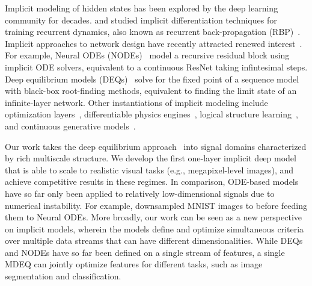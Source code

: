 \documentclass{article}
\begin{document}
Implicit modeling of hidden states has been explored by the deep learning community for decades. \citet{pineda1988generalization} and \citet{almeida1990learning} studied implicit differentiation techniques for training recurrent dynamics, also known as recurrent back-propagation (RBP)~\cite{liao2018reviving}. Implicit approaches to network design have recently attracted renewed interest~\cite{elghaoui2019implicit,Gould2019}. For example, Neural ODEs (NODEs)~\cite{chen2018neural,dupont2019augmented} model a recursive residual block using implicit ODE solvers, equivalent to a continuous ResNet taking infintesimal steps. Deep equilibrium models (DEQs)~\cite{bai2019deep} solve for the fixed point of a sequence model with black-box root-finding methods, equivalent to finding the limit state of an infinite-layer network. Other instantiations of implicit modeling include optimization layers~\cite{djolonga2017differentiable,amos2017optnet}, differentiable physics engines~\cite{de2018end,Qiao2020}, logical structure learning~\cite{wang2019satnet}, and continuous generative models~\cite{grathwohl2019ffjord}.

Our work takes the deep equilibrium approach~\cite{bai2019deep} into signal domains characterized by rich multiscale structure. We develop the first one-layer implicit deep model that is able to scale to realistic visual tasks (e.g., megapixel-level images), and achieve competitive results in these regimes. In comparison, ODE-based models have so far only been applied to relatively low-dimensional signals due to numerical instability. For example, \citet{chen2018neural} downsampled  MNIST images to  before feeding them to Neural ODEs. More broadly, our work can be seen as a new perspective on implicit models, wherein the models define and optimize simultaneous criteria over multiple data streams that can have different dimensionalities. While DEQs and NODEs have so far been defined on a single stream of features, a single MDEQ can jointly optimize features for different tasks, such as image segmentation and classification.

\vspace{-.1in}
\end{document}
